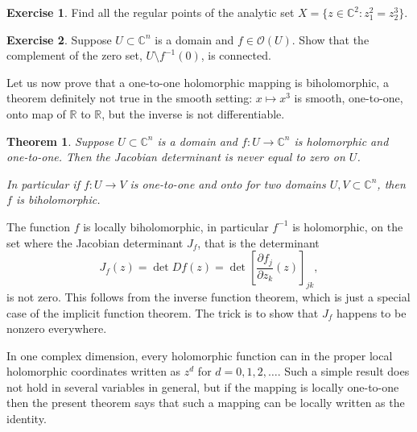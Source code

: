 \documentclass[12pt,openany]{book}
\newcommand{\C}{{\mathbb{C}}}
\newcommand{\R}{{\mathbb{R}}}
\newcommand{\sO}{{\mathcal{O}}}
\theoremstyle{plain}
\newtheorem{thm}{Theorem}[section]
\theoremstyle{remark}
\theoremstyle{definition}
\newenvironment{exbox}{%
    \def\FrameCommand{\vrule width 1pt \relax\hspace {10pt}}%
    \MakeFramed {\advance \hsize -\width \FrameRestore }%
}{%
    \endMakeFramed
}
\theoremstyle{exercise}
\newtheorem{exercise}{Exercise}[section]
\theoremstyle{example}
\begin{document}
\begin{exbox}
\begin{exercise}
Find all the regular points of the analytic set
$X = \{ z \in \C^2 : z_1^2 = z_2^3 \}$.
\end{exercise}

\begin{exercise} \label{exercise:connectedcomplement}
Suppose $U \subset \C^n$ is a domain and $f \in \sO(U)$.
Show that the complement of the zero set, $U \setminus f^{-1}(0)$, is
connected.
\end{exercise}
\end{exbox}

Let us now prove that a one-to-one holomorphic
mapping is biholomorphic, a theorem definitely not true in the
smooth setting: $x \mapsto x^3$ is smooth, one-to-one, onto map
of $\R$ to $\R$, but the inverse is not differentiable.

\begin{thm} \label{thm:injective}
Suppose $U \subset \C^n$ is a domain and $f \colon U \to \C^n$ is
holomorphic and one-to-one.  Then the Jacobian determinant is never equal to zero 
on $U$.

In particular if $f \colon U \to V$ is
one-to-one and onto for two domains $U,V \subset \C^n$, then $f$ is
biholomorphic.
\end{thm}

The function $f$ is locally biholomorphic, in particular
$f^{-1}$ is holomorphic,
on the set where the Jacobian determinant $J_f$, that is the determinant
\begin{equation*}
J_f(z) = \det Df(z) = \det \left[ \frac{\partial f_j}{\partial z_k}(z)
\right]_{jk} ,
\end{equation*}
is not zero.  This follows from the inverse function theorem, which is just
a special case of the implicit function theorem.
The trick is to show that $J_f$ happens to be nonzero
everywhere.

In one complex dimension, every holomorphic function can in
the proper local holomorphic coordinates written as $z^d$ for $d=0,1,2,\ldots$.
Such a simple result
does not hold in several variables in general, but if the mapping is
locally one-to-one then the present theorem says that such a mapping can be
locally written as the identity.
\end{document}
